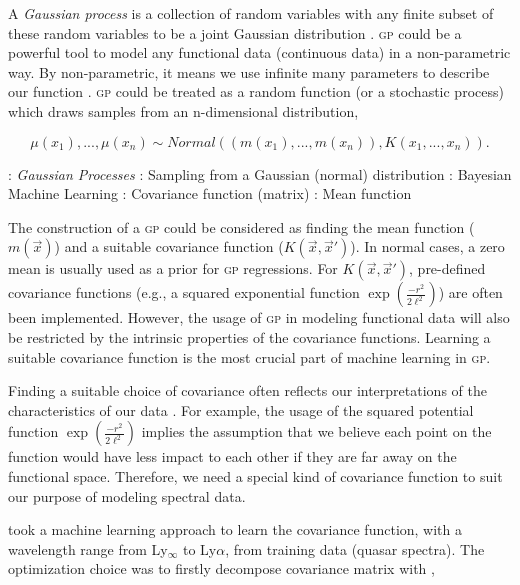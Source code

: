 \documentclass{ar-1col}
\begin{document}
A {\it Gaussian process} is a collection of random variables with any finite subset of these random variables to be a joint Gaussian distribution \citep{Rasmussen2005}. \textsc{gp} could be a powerful tool to model any functional data (continuous data) in a non-parametric way. 
By non-parametric, it means we use infinite many parameters to describe our function \citep{Gelman04}. \textsc{gp} could be treated as a random function (or a stochastic process) which draws samples from an n-dimensional distribution, 

\begin{equation}
    \mu(x_1), ..., \mu(x_n) \sim Normal((m(x_1), ..., m(x_n)), K(x_1, ..., x_n)).
    \label{eq:GP}
\end{equation}

\begin{marginnote}[120pt]
    : \textit{Gaussian Processes}
    : Sampling from a Gaussian (normal) distribution
    : Bayesian Machine Learning    
    : Covariance function (matrix)
    \entry{$\mu$}: Mean function
\end{marginnote} 

The construction of a \textsc{gp} could be considered as finding the mean function ($m(\vec x)$) and a suitable covariance function ($K(\vec x, \vec x')$). 
In normal cases, a zero mean is usually used as a prior for \textsc{gp} regressions. For $K(\vec x, \vec x')$, pre-defined covariance functions (e.g., a squared exponential function $\exp{(\frac{-r^2}{2 \ell^2})}$) are often been implemented. 
However, the usage of \textsc{gp} in modeling functional data will also be restricted by the intrinsic properties of the covariance functions.
Learning a suitable covariance function is the most crucial part of machine learning in \textsc{gp}.

Finding a suitable choice of covariance often reflects our interpretations of the characteristics of our data  \citep{Rasmussen2005}. 
For example, the usage of the squared potential function $\exp{(\frac{-r^2}{2 \ell^2})}$ implies the assumption that we believe each point on the function would have less impact to each other if they are far away on the functional space.
Therefore, we need a special kind of covariance function to suit our purpose of modeling spectral data.

\citet{Garnett17} took a machine learning approach to learn the covariance function, with a wavelength range from Ly$_\infty$ to Ly$\alpha$, from training data (quasar spectra). 
The optimization choice was to firstly decompose covariance matrix with \citep{Garnett2015},
\end{document}
